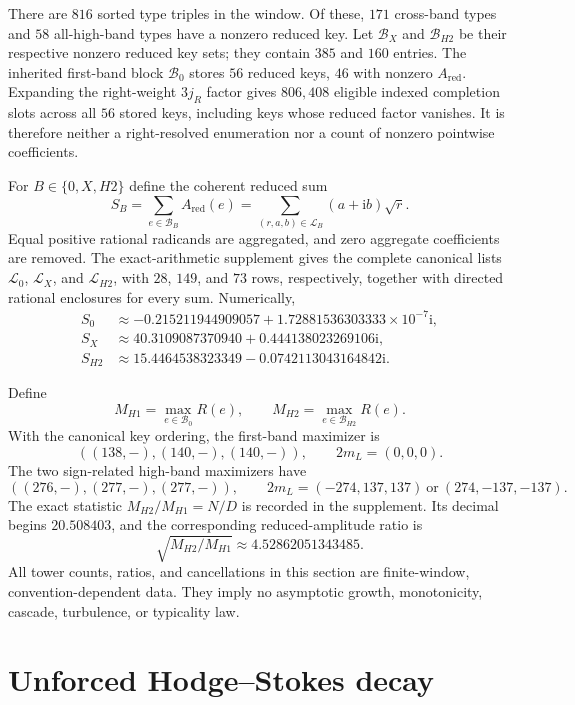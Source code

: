 \documentclass[12pt]{article}
\theoremstyle{definition}
\theoremstyle{remark}
\newcommand{\ii}{\mathrm i}
\begin{document}
There are $816$ sorted type triples in the window.  Of these, $171$
cross-band types and $58$ all-high-band types have a nonzero reduced key.
Let $\mathcal B_X$ and $\mathcal B_{H2}$ be their respective nonzero reduced
key sets; they contain $385$ and $160$ entries.  The inherited first-band
block $\mathcal B_0$ stores $56$ reduced keys, $46$ with nonzero
$A_{\mathrm{red}}$.  Expanding the right-weight $3j_R$ factor gives
$806{,}408$ eligible indexed completion slots across all $56$ stored keys,
including keys whose reduced factor vanishes.  It is therefore neither a
right-resolved enumeration nor a count of nonzero pointwise coefficients.

For $B\in\{0,X,H2\}$ define the coherent reduced sum
\[
 S_B=\sum_{e\in\mathcal B_B}A_{\mathrm{red}}(e)
     =\sum_{(r,a,b)\in\mathcal L_B}(a+\ii b)\sqrt r.
\]
Equal positive rational radicands are aggregated, and zero aggregate
coefficients are removed.  The exact-arithmetic supplement gives the complete
canonical lists $\mathcal L_0$, $\mathcal L_X$, and $\mathcal L_{H2}$, with
$28$, $149$, and $73$ rows, respectively, together with directed rational
enclosures for every sum.  Numerically,
\begin{align*}
 S_0&\approx-0.215211944909057
       +1.72881536303333\times10^{-7}\ii,\\
 S_X&\approx40.3109087370940+0.444138023269106\ii,\\
 S_{H2}&\approx15.4464538323349-0.0742113043164842\ii.
\end{align*}

Define
\[
 M_{H1}=\max_{e\in\mathcal B_0}R(e),\qquad
 M_{H2}=\max_{e\in\mathcal B_{H2}}R(e).
\]
With the canonical key ordering, the first-band maximizer is
\[
 ((138,-),(140,-),(140,-)),\qquad 2m_L=(0,0,0).
\]
The two sign-related high-band maximizers have
\[
 ((276,-),(277,-),(277,-)),\qquad
 2m_L=(-274,137,137)\ \text{or}\ (274,-137,-137).
\]
The exact statistic $M_{H2}/M_{H1}=N/D$ is recorded in the supplement.  Its
decimal begins $20.508403$, and the corresponding reduced-amplitude ratio is
\[
 \sqrt{M_{H2}/M_{H1}}\approx4.52862051343485.
\]
All tower counts, ratios, and cancellations in this section are finite-window,
convention-dependent data.  They imply no asymptotic growth, monotonicity,
cascade, turbulence, or typicality law.

\section{Unforced Hodge--Stokes decay}\label{sec:decay}
\end{document}
